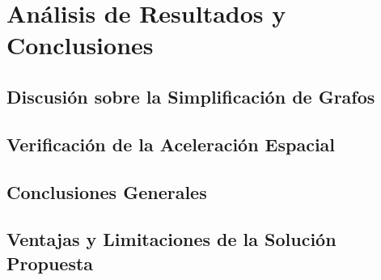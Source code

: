 \chapter{Análisis de Resultados y Conclusiones}

\section{Discusión sobre la Simplificación de Grafos}

\section{Verificación de la Aceleración Espacial}

\section{Conclusiones Generales}

\section{Ventajas y Limitaciones de la Solución Propuesta}
